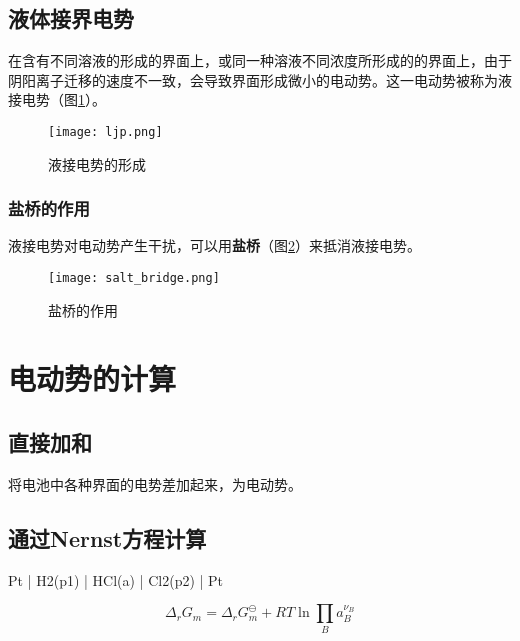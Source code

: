     \subsection{液体接界电势}

    在含有不同溶液的形成的界面上，或同一种溶液不同浓度所形成的的界面上，由于阴阳离子迁移的速度不一致，会导致界面形成微小的电动势。这一电动势被称为液接电势（图\ref{fig:ljp}）。

    \begin{figure}[h]
        \centering
        \texttt{[image: ljp.png]}
        \caption{液接电势的形成}
        \label{fig:ljp}
    \end{figure}

    \subsubsection{盐桥的作用}

    液接电势对电动势产生干扰，可以用\textbf{盐桥}（图\ref{fig:salt_bridge}）来抵消液接电势。


    \begin{figure}[h]
        \centering
        \texttt{[image: salt\_bridge.png]}
        \caption{盐桥的作用}
        \label{fig:salt_bridge}
    \end{figure}

    \section{电动势的计算}

    \subsection{直接加和}

    将电池中各种界面的电势差加起来，为电动势。

    \subsection{通过Nernst方程计算}

    \begin{reaction*}
        Pt | H2(p1) | HCl(a) | Cl2(p2) | Pt
    \end{reaction*}

    \begin{equation*}
        \Delta_r G_m = \Delta_r G_m ^\ominus + RT\ln \prod _{B} a_B^{\nu_B}
    \end{equation*}

